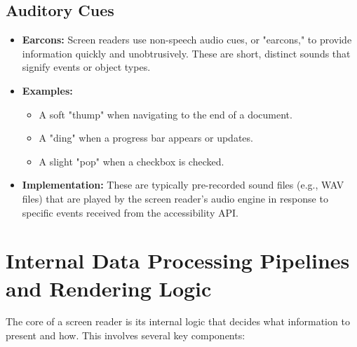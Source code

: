 \subsection{Auditory Cues}
\label{sub:auditory-cues}

\begin{itemize}
	\item \textbf{Earcons:} Screen readers use non-speech audio cues, or "earcons," to provide information quickly and unobtrusively. These are short, distinct sounds that signify events or object types.
	\item \textbf{Examples:}
	      \begin{itemize}
		      \item A soft "thump" when navigating to the end of a document.
		      \item A "ding" when a progress bar appears or updates.
		      \item A slight "pop" when a checkbox is checked.
	      \end{itemize}
	\item \textbf{Implementation:} These are typically pre-recorded sound files (e.g., WAV files) that are played by the screen reader's audio engine in response to specific events received from the accessibility API.
\end{itemize}

\section{Internal Data Processing Pipelines and Rendering Logic}
\label{sec:internal-data-processing-pipelines-and-rendering-logic}

The core of a screen reader is its internal logic that decides what information to present and how. This involves several key components:

